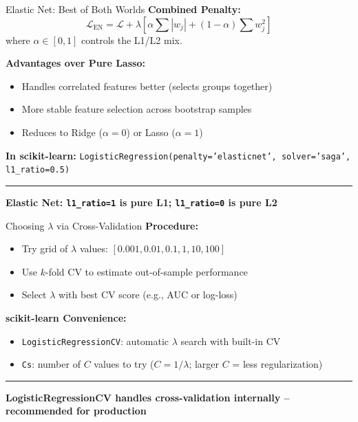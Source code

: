 \documentclass[8pt,aspectratio=169]{beamer}
\newcommand{\bottomnote}[1]{%
\vfill
\vspace{-2mm}
\textcolor{mllavender2}{\rule{\textwidth}{0.4pt}}
\vspace{1mm}
\footnotesize
\textbf{#1}
}
\begin{document}
\begin{frame}[t]{Elastic Net: Best of Both Worlds}
\textbf{Combined Penalty:}
$$\mathcal{L}_{\text{EN}} = \mathcal{L} + \lambda\!\left[\alpha \sum |w_j| + (1-\alpha)\sum w_j^2\right]$$
where $\alpha \in [0,1]$ controls the L1/L2 mix.

\vspace{0.5em}
\textbf{Advantages over Pure Lasso:}
\begin{itemize}
\item Handles correlated features better (selects groups together)
\item More stable feature selection across bootstrap samples
\item Reduces to Ridge ($\alpha=0$) or Lasso ($\alpha=1$)
\end{itemize}
\vspace{0.3em}
\textbf{In scikit-learn:}
\texttt{LogisticRegression(penalty='elasticnet', solver='saga', l1\_ratio=0.5)}
\bottomnote{Elastic Net: \texttt{l1\_ratio=1} is pure L1; \texttt{l1\_ratio=0} is pure L2}
\end{frame}

\begin{frame}[t]{Choosing $\lambda$ via Cross-Validation}
\textbf{Procedure:}
\begin{itemize}
\item Try grid of $\lambda$ values: $[0.001, 0.01, 0.1, 1, 10, 100]$
\item Use $k$-fold CV to estimate out-of-sample performance
\item Select $\lambda$ with best CV score (e.g., AUC or log-loss)
\end{itemize}
\vspace{0.5em}
\textbf{scikit-learn Convenience:}
\begin{itemize}
\item \texttt{LogisticRegressionCV}: automatic $\lambda$ search with built-in CV
\item \texttt{Cs}: number of $C$ values to try ($C = 1/\lambda$; larger $C$ = less regularization)
\end{itemize}
\bottomnote{LogisticRegressionCV handles cross-validation internally -- recommended for production}
\end{frame}
\end{document}
